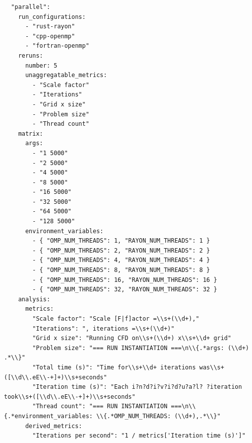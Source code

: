 \begin{code}
\begin{verbatim}
  "parallel":
    run_configurations:
      - "rust-rayon"
      - "cpp-openmp"
      - "fortran-openmp"
    reruns:
      number: 5
      unaggregatable_metrics:
        - "Scale factor"
        - "Iterations"
        - "Grid x size"
        - "Problem size"
        - "Thread count"
    matrix:
      args:
        - "1 5000"
        - "2 5000"
        - "4 5000"
        - "8 5000"
        - "16 5000"
        - "32 5000"
        - "64 5000"
        - "128 5000"
      environment_variables:
        - { "OMP_NUM_THREADS": 1, "RAYON_NUM_THREADS": 1 }
        - { "OMP_NUM_THREADS": 2, "RAYON_NUM_THREADS": 2 }
        - { "OMP_NUM_THREADS": 4, "RAYON_NUM_THREADS": 4 }
        - { "OMP_NUM_THREADS": 8, "RAYON_NUM_THREADS": 8 }
        - { "OMP_NUM_THREADS": 16, "RAYON_NUM_THREADS": 16 }
        - { "OMP_NUM_THREADS": 32, "RAYON_NUM_THREADS": 32 }
    analysis:
      metrics:
        "Scale factor": "Scale [F|f]actor =\\s+(\\d+),"
        "Iterations": ", iterations =\\s+(\\d+)"
        "Grid x size": "Running CFD on\\s+(\\d+) x\\s+\\d+ grid"
        "Problem size": "=== RUN INSTANTIATION ===\n\\{.*args: (\\d+) .*\\}"
        "Total time (s)": "Time for\\s+\\d+ iterations was\\s+([\\d\\.eE\\-+]+)\\s+seconds"
        "Iteration time (s)": "Each i?n?d?i?v?i?d?u?a?l? ?iteration took\\s+([\\d\\.eE\\-+]+)\\s+seconds"
        "Thread count": "=== RUN INSTANTIATION ===\n\\{.*environment_variables: \\{.*OMP_NUM_THREADS: (\\d+),.*\\}"
      derived_metrics:
        "Iterations per second": "1 / metrics['Iteration time (s)']"

\end{verbatim}
\end{code}
